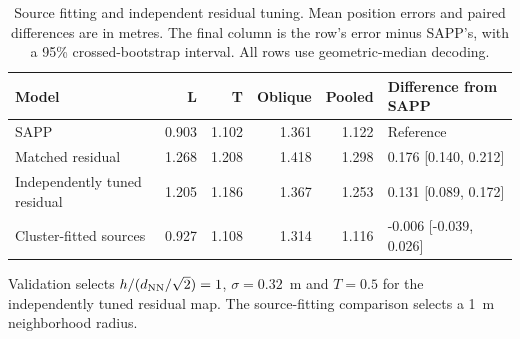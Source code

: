\begin{table}[ht]
\centering\small
\caption{Source fitting and independent residual tuning. Mean position errors and paired differences are in metres. The final column is the row's error minus SAPP's, with a 95\% crossed-bootstrap interval. All rows use geometric-median decoding.}
\label{tab:optimized}
\begin{tabular}{lrrrrl}
\toprule
Model & L & T & Oblique & Pooled & Difference from SAPP\\\midrule
SAPP & 0.903 & 1.102 & 1.361 & 1.122 & Reference \\
Matched residual & 1.268 & 1.208 & 1.418 & 1.298 & 0.176 [0.140, 0.212] \\
Independently tuned residual & 1.205 & 1.186 & 1.367 & 1.253 & 0.131 [0.089, 0.172] \\
Cluster-fitted sources & 0.927 & 1.108 & 1.314 & 1.116 & -0.006 [-0.039, 0.026] \\
\bottomrule
\end{tabular}
\end{table}

Validation selects $h/(d_{\rm NN}/\sqrt2)=1$, $\sigma=0.32$~m and $T=0.5$ for the independently tuned residual map. The source-fitting comparison selects a 1~m neighborhood radius.
